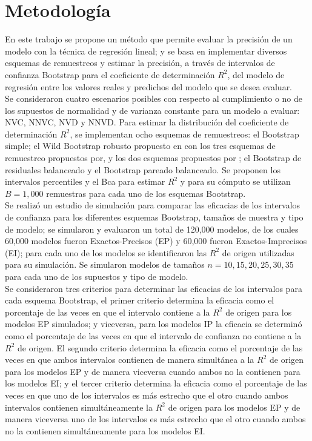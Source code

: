 \section{Metodología}
En este trabajo se propone un método que permite evaluar la precisión de un modelo con la técnica de regresión lineal; y se basa en implementar diversos esquemas de remuestreos y estimar la precisión, a través de intervalos de confianza Bootstrap para el coeficiente de determinación $R^2$, del modelo de regresión entre los valores reales y predichos del modelo que se desea evaluar.\\

Se consideraron cuatro escenarios posibles con respecto al cumplimiento o no de los supuestos de normalidad y de varianza constante para un modelo a evaluar: NVC, NNVC, NVD y NNVD. Para estimar la distribución del coeficiente de determinación $R^2$, se implementan ocho esquemas de remuestreos: el Bootstrap simple; el Wild Bootstrap robusto propuesto en \textcite{rana-2012} con los tres esquemas de remuestreo propuestos por\textcite{wu-1986}, y los dos esquemas propuestos por \textcite{wu-1986}; el Bootstrap de residuales balanceado y el Bootstrap pareado balanceado. Se proponen los intervalos percentiles y el Bca para estimar $R^2$ y para su cómputo se utilizan $B=1,000$ remuestras para cada uno de los esquemas Bootstrap.\\ 

Se realizó un estudio de simulación para comparar las eficacias de los intervalos de confianza para los diferentes esquemas Bootstrap, tamaños de muestra y tipo de modelo; se simularon y evaluaron un total de 120,000 modelos, de los cuales 60,000 modelos fueron Exactos-Precisos (EP) y 60,000 fueron Exactos-Imprecisos (EI); para cada uno de los modelos se identificaron las $R^2$ de origen utilizadas para su simulación. Se simularon modelos de tamaños $n=10, 15, 20, 25, 30, 35$ para cada uno de los supuestos y tipo de modelo.\\  

Se consideraron tres criterios para determinar las eficacias de los intervalos para cada esquema Bootstrap, el primer criterio determina la eficacia como el porcentaje de las veces en que el intervalo contiene a la $R^2$ de origen para los modelos EP simulados; y viceversa, para los modelos IP la eficacia se determinó como el porcentaje de las veces en que el intervalo de confianza no contiene a la $R^2$ de origen. El segundo criterio determina la eficacia como el porcentaje de las veces en que ambos intervalos contienen de manera simultánea a la $R^2$ de origen para los modelos EP y de manera viceversa cuando ambos no la contienen para los modelos EI; y el tercer criterio determina la eficacia como el porcentaje de las veces en que uno de los intervalos es más estrecho que el otro cuando ambos intervalos contienen simultáneamente la $R^2$ de origen para los modelos EP y de manera viceversa uno de los intervalos es más estrecho que el otro cuando ambos no la contienen simultáneamente para los modelos EI.\\

